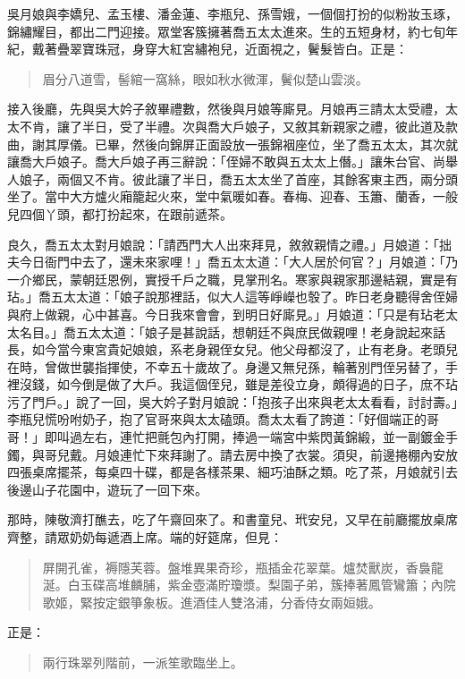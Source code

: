 吳月娘與李嬌兒、孟玉樓、潘金蓮、李瓶兒、孫雪娥，一個個打扮的似粉妝玉琢，錦繡耀目，都出二門迎接。眾堂客簇擁著喬五太太進來。生的五短身材，約七旬年紀，戴著疊翠寶珠冠，身穿大紅宮繡袍兒，近面視之，鬢髮皆白。正是：
\begin{quote}
眉分八道雪，髻綰一窩絲，眼如秋水微渾，鬢似楚山雲淡。
\end{quote}
接入後廳，先與吳大妗子敘畢禮數，然後與月娘等廝見。月娘再三請太太受禮，太太不肯，讓了半日，受了半禮。次與喬大戶娘子，又敘其新親家之禮，彼此道及款曲，謝其厚儀。已畢，然後向錦屏正面設放一張錦裀座位，坐了喬五太太，其次就讓喬大戶娘子。喬大戶娘子再三辭說：「侄婦不敢與五太太上僭。」讓朱台官、尚舉人娘子，兩個又不肯。彼此讓了半日，喬五太太坐了首座，其餘客東主西，兩分頭坐了。當中大方爐火廂籠起火來，堂中氣暖如春。春梅、迎春、玉簫、蘭香，一般兒四個丫頭，都打扮起來，在跟前遞茶。

良久，喬五太太對月娘說：「請西門大人出來拜見，敘敘親情之禮。」月娘道：「拙夫今日衙門中去了，還未來家哩！」喬五太太道：「大人居於何官？」月娘道：「乃一介鄉民，蒙朝廷恩例，實授千戶之職，見掌刑名。寒家與親家那邊結親，實是有玷。」喬五太太道：「娘子說那裡話，似大人這等崢嶸也彀了。昨日老身聽得舍侄婦與府上做親，心中甚喜。今日我來會會，到明日好廝見。」月娘道：「只是有玷老太太名目。」喬五太太道：「娘子是甚說話，想朝廷不與庶民做親哩！老身說起來話長，如今當今東宮貴妃娘娘，系老身親侄女兒。他父母都沒了，止有老身。老頭兒在時，曾做世襲指揮使，不幸五十歲故了。身邊又無兒孫，輪著別門侄另替了，手裡沒錢，如今倒是做了大戶。我這個侄兒，雖是差役立身，頗得過的日子，庶不玷污了門戶。」說了一回，吳大妗子對月娘說：「抱孩子出來與老太太看看，討討壽。」李瓶兒慌吩咐奶子，抱了官哥來與太太磕頭。喬太太看了誇道：「好個端正的哥哥！」即叫過左右，連忙把氈包內打開，捧過一端宮中紫閃黃錦緞，並一副鍍金手鐲，與哥兒戴。月娘連忙下來拜謝了。請去房中換了衣裳。須臾，前邊捲棚內安放四張桌席擺茶，每桌四十碟，都是各樣茶果、細巧油酥之類。吃了茶，月娘就引去後邊山子花園中，遊玩了一回下來。

那時，陳敬濟打醮去，吃了午齋回來了。和書童兒、玳安兒，又早在前廳擺放桌席齊整，請眾奶奶每遞酒上席。端的好筵席，但見：
\begin{quote}
屏開孔雀，褥隱芙蓉。盤堆異果奇珍，瓶插金花翠葉。爐焚獸炭，香裊龍涎。白玉碟高堆麟脯，紫金壺滿貯瓊漿。梨園子弟，簇捧著鳳管鸞簫；內院歌姬，緊按定銀箏象板。進酒佳人雙洛浦，分香侍女兩姮娥。
\end{quote}
正是：
\begin{quote}
兩行珠翠列階前，一派笙歌臨坐上。
\end{quote}

